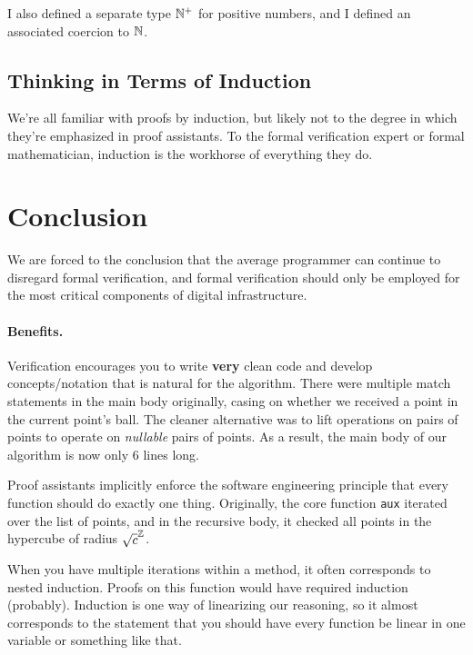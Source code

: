 \documentclass{article}
\begin{document}
I also defined a separate type $\mathbb{N}^+$ for positive numbers, and I defined an associated coercion to $\mathbb{N}$.

\subsection{Thinking in Terms of Induction}
We're all familiar with proofs by induction, but likely not to the degree in which they're emphasized in proof assistants.
To the formal verification expert or formal mathematician, induction is the workhorse of everything they do.

\section{Conclusion}
We are forced to the conclusion that the average programmer can continue to disregard formal verification, and formal verification should only be employed for the most critical components of digital infrastructure.

\paragraph{Benefits.}
Verification encourages you to write \textbf{very} clean code and develop concepts/notation that is natural for the algorithm.
There were multiple match statements in the main body originally, casing on whether we received a point in the current point's ball.
The cleaner alternative was to lift operations on pairs of points to operate on \textit{nullable} pairs of points.
As a result, the main body of our algorithm is now only 6 lines long.

Proof assistants implicitly enforce the software engineering principle that every function should do exactly one thing.
Originally, the core function \texttt{aux} iterated over the list of points, and in the recursive body, it checked all points in the hypercube of radius $\sqrt{c}^{\mathbb{Z}}$.

When you have multiple iterations within a method, it often corresponds to nested induction.
Proofs on this function would have required induction (probably).
Induction is one way of linearizing our reasoning, so it almost corresponds to the statement that you should have every function be linear in one variable or something like that.
\end{document}
